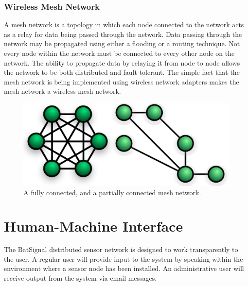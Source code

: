 \documentclass[11pt,a4paper]{article}
\begin{document}
\subsubsection{Wireless Mesh Network}
A mesh network is a topology in which each node connected to the network acts as a relay for data being passed through the network. Data passing through the network may be propagated using either a flooding or a routing technique. Not every node within the network must be connected to every other node on the network. The ability to propagate data by relaying it from node to node allows the network to be both distributed and fault tolerant. The simple fact that the mesh network is being implemented using wireless network adapters makes the mesh network a wireless mesh network. 
\begin{figure}[h!]
	\centering
		\includegraphics[width=\textwidth, keepaspectratio=true]{Graphics/mesh-networks.jpg}
	\caption{A fully connected, and a partially connected mesh network.}
\end{figure}


\section{Human-Machine Interface}
The BatSignal distributed sensor network is designed to work transparently to the user. A regular user will provide input to the system by speaking within the environment where a sensor node has been installed. An administrative user will receive output from the system via email messages. 
\end{document}
